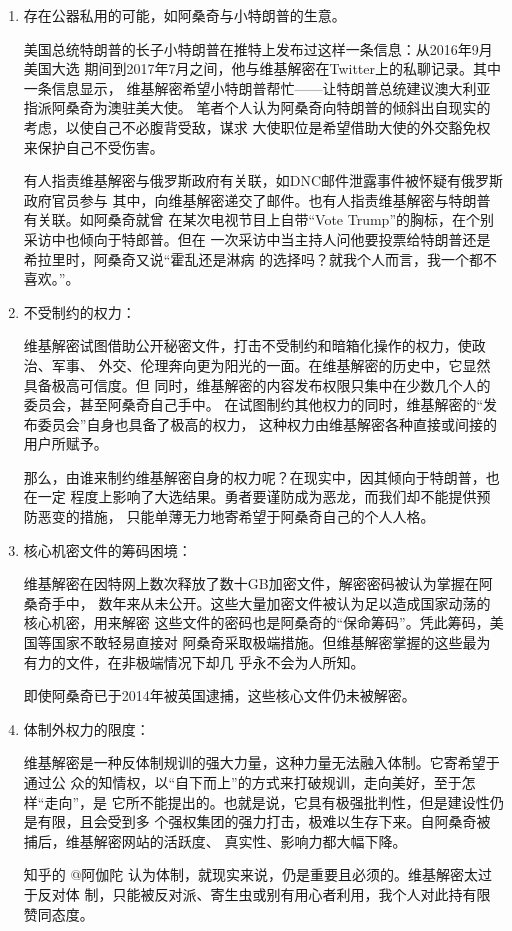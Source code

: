 \begin{enumerate}
\item 存在公器私用的可能，如阿桑奇与小特朗普的生意。

  美国总统特朗普的长子小特朗普在推特上发布过这样一条信息：从2016年9月美国大选
  期间到2017年7月之间，他与维基解密在Twitter上的私聊记录。其中一条信息显示，
  维基解密希望小特朗普帮忙——让特朗普总统建议澳大利亚指派阿桑奇为澳驻美大使。
  笔者个人认为阿桑奇向特朗普的倾斜出自现实的考虑，以使自己不必腹背受敌，谋求
  大使职位是希望借助大使的外交豁免权来保护自己不受伤害。

  有人指责维基解密与俄罗斯政府有关联，如DNC邮件泄露事件被怀疑有俄罗斯政府官员参与
  其中，向维基解密递交了邮件。也有人指责维基解密与特朗普有关联。如阿桑奇就曾
  在某次电视节目上自带“Vote Trump”的胸标，在个别采访中也倾向于特郎普。但在
  一次采访中当主持人问他要投票给特朗普还是希拉里时，阿桑奇又说“霍乱还是淋病
  的选择吗？就我个人而言，我一个都不喜欢。”。

\item 不受制约的权力：

  维基解密试图借助公开秘密文件，打击不受制约和暗箱化操作的权力，使政治、军事、
  外交、伦理奔向更为阳光的一面。在维基解密的历史中，它显然具备极高可信度。但
  同时，维基解密的内容发布权限只集中在少数几个人的委员会，甚至阿桑奇自己手中。
  在试图制约其他权力的同时，维基解密的“发布委员会”自身也具备了极高的权力，
  这种权力由维基解密各种直接或间接的用户所赋予。

  那么，由谁来制约维基解密自身的权力呢？在现实中，因其倾向于特朗普，也在一定
  程度上影响了大选结果。勇者要谨防成为恶龙，而我们却不能提供预防恶变的措施，
  只能单薄无力地寄希望于阿桑奇自己的个人人格。


\item 核心机密文件的筹码困境：

  维基解密在因特网上数次释放了数十GB加密文件，解密密码被认为掌握在阿桑奇手中，
  数年来从未公开。这些大量加密文件被认为足以造成国家动荡的核心机密，用来解密
  这些文件的密码也是阿桑奇的“保命筹码”。凭此筹码，美国等国家不敢轻易直接对
  阿桑奇采取极端措施。但维基解密掌握的这些最为有力的文件，在非极端情况下却几
  乎永不会为人所知。

  即使阿桑奇已于2014年被英国逮捕，这些核心文件仍未被解密。

\item 体制外权力的限度：

  维基解密是一种反体制规训的强大力量，这种力量无法融入体制。它寄希望于通过公
  众的知情权，以“自下而上”的方式来打破规训，走向美好，至于怎样“走向”，是
  它所不能提出的。也就是说，它具有极强批判性，但是建设性仍是有限，且会受到多
  个强权集团的强力打击，极难以生存下来。自阿桑奇被捕后，维基解密网站的活跃度、
  真实性、影响力都大幅下降。

  知乎的 @阿伽陀 认为体制，就现实来说，仍是重要且必须的。维基解密太过于反对体
  制，只能被反对派、寄生虫或别有用心者利用，我个人对此持有限赞同态度。
\end{enumerate}


